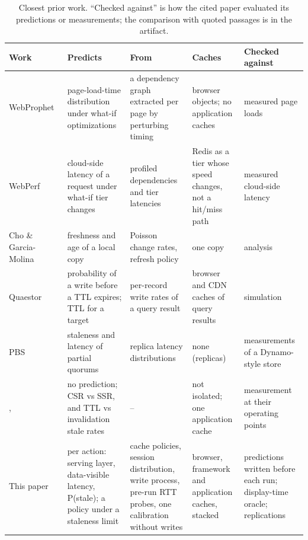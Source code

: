 \documentclass[acmsmall,review,nonacm]{acmart}
\begin{document}
\begin{table}[t]
\centering\small
\caption{Closest prior work. ``Checked against'' is how the cited paper evaluated its predictions or measurements; the comparison with quoted passages is in the artifact.}
\label{tab:closest}
\begin{tabularx}{\textwidth}{>{\raggedright\arraybackslash}p{2.3cm} >{\raggedright\arraybackslash}X >{\raggedright\arraybackslash}X >{\raggedright\arraybackslash}p{2.5cm} >{\raggedright\arraybackslash}p{2.6cm}}
\toprule
Work & Predicts & From & Caches & Checked against \\
\midrule
WebProphet~\cite{li2010webprophet} & page-load-time distribution under what-if optimizations & a dependency graph extracted per page by perturbing timing & browser objects; no application caches & measured page loads \\
WebPerf~\cite{jiang2016webperf} & cloud-side latency of a request under what-if tier changes & profiled dependencies and tier latencies & Redis as a tier whose speed changes, not a hit/miss path & measured cloud-side latency \\
Cho \& Garcia-Molina~\cite{cho2000freshness} & freshness and age of a local copy & Poisson change rates, refresh policy & one copy & analysis \\
Quaestor~\cite{gessert2017quaestor} & probability of a write before a TTL expires; TTL for a target & per-record write rates of a query result & browser and CDN caches of query results & simulation \\
PBS~\cite{bailis2012pbs} & staleness and latency of partial quorums & replica latency distributions & none (replicas) & measurements of a Dynamo-style store \\
\citet{pati2025nextjs}, \citet{ji2023transparent} & no prediction; CSR vs SSR, and TTL vs invalidation stale rates & -- & not isolated; one application cache & measurement at their operating points \\
This paper & per action: serving layer, data-visible latency, P(stale); a policy under a staleness limit & cache policies, session distribution, write process, pre-run RTT probes, one calibration without writes & browser, framework and application caches, stacked & predictions written before each run; display-time oracle; replications \\
\bottomrule
\end{tabularx}
\end{table}

\end{document}
